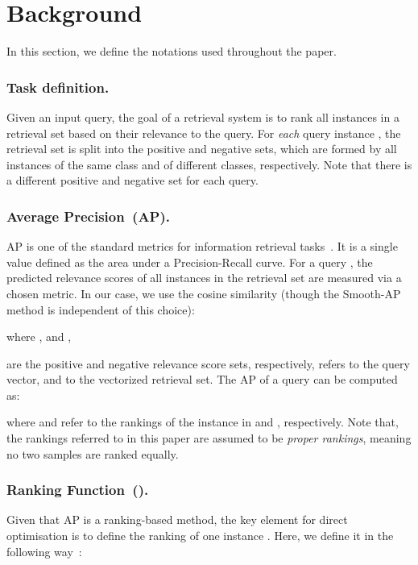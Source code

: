 \documentclass[runningheads]{llncs}
\begin{document}
 \label{sec:related}


\section{Background}
In this section, we define the  notations used throughout the paper.

\subsubsection{Task definition.} 
Given an input query, 
the goal of a retrieval system is to rank all instances in a retrieval set  based on their relevance to the query. 
For \emph{each} query instance , 
the retrieval set is split into the positive  and negative  sets, 
which are formed by all instances of the same class and of different classes, respectively. 
Note that there is a different positive and negative set for each query.

\subsubsection{Average Precision~(AP).}
\label{sec:bg_ap}
AP is one of the standard metrics for information retrieval tasks~\cite{Manning08}. 
It is a single value defined as the area under a Precision-Recall curve. 
For a query , 
the predicted relevance scores of all instances in the retrieval set are measured via a chosen metric. In our case, we use the cosine similarity (though the Smooth-AP method is independent of this choice):

where , 
and , 

are the positive and negative relevance score sets, respectively,  refers to the query vector, 
and  to the vectorized retrieval set. 
The AP of a query  can be computed as:

where  and  refer to the rankings of the instance  in  and , respectively. 
Note that, the rankings referred to in this paper are assumed to be \textit{proper rankings}, 
meaning no two samples are ranked equally. 


\subsubsection{Ranking Function~().}
\label{sub:interpreting}
Given that AP is a ranking-based method, 
the key element for direct optimisation is to define the ranking  of one instance . 
Here, we define it in the following way~\cite{Qin10}:
\end{document}
